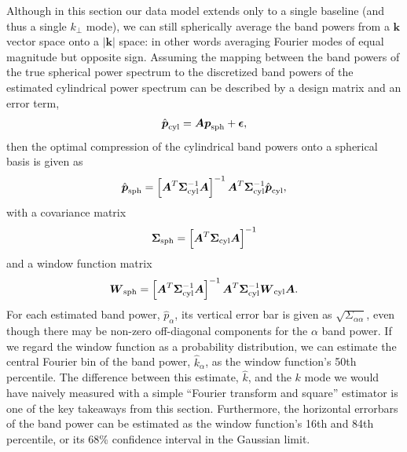 \documentclass[a4paper,fleqn,usenatbib]{mnras}
\def\p{\boldsymbol{p}}
\def\W{\boldsymbol{W}}
\def\bSigma{\boldsymbol{\Sigma}}
\def\bk{\boldsymbol{k}}
\def\A{\boldsymbol{A}}
\def\kperp{k_{\perp}}
\begin{document}
Although in this section our data model extends only to a single baseline (and thus a single $\kperp$ mode), we can still spherically average the band powers from a $\bk$ vector space onto a $|\bk|$ space: in other words averaging Fourier modes of equal magnitude but opposite sign.
Assuming the mapping between the band powers of the true spherical power spectrum to the discretized band powers of the estimated cylindrical power spectrum can be described by a design matrix and an error term,
\begin{align}
\hat{\p}_{\rm cyl} = \A\p_{\rm sph} + \boldsymbol{\epsilon},
\end{align}
then the optimal compression of the cylindrical band powers onto a spherical basis \citep{Dillon2014} is given as
\begin{align}
\hat{\p}_{\rm sph} = \left[\A^T\bSigma_{\rm cyl}^{-1}\A\right]^{-1}\A^T\bSigma_{\rm cyl}^{-1}\hat{\p}_{\rm cyl},
\end{align}
with a covariance matrix
\begin{align}
\bSigma_{\rm sph} = \left[\A^T\bSigma_{\rm cyl}\A\right]^{-1}
\end{align}
and a window function matrix
\begin{align}
\label{eq:sph_window}
\W_{\rm sph} = \left[\A^T\bSigma_{\rm cyl}^{-1}\A\right]^{-1}\A^T\bSigma_{\rm cyl}^{-1}\W_{\rm cyl}\A.
\end{align}
For each estimated band power, $\hat{p}_\alpha$, its vertical error bar is given as $\sqrt{\Sigma_{\alpha\alpha}}$, even though there may be non-zero off-diagonal components for the $\alpha$ band power.
If we regard the window function as a probability distribution, we can estimate the central Fourier bin of the band power, $\hat{k}_\alpha$, as the window function's 50th percentile.
The difference between this estimate, $\hat{k}$, and the $k$ mode we would have naively measured with a simple ``Fourier transform and square'' estimator is one of the key takeaways from this section.
Furthermore, the horizontal errorbars of the band power can be estimated as the window function's 16th and 84th percentile, or its 68\% confidence interval in the Gaussian limit.
\end{document}
